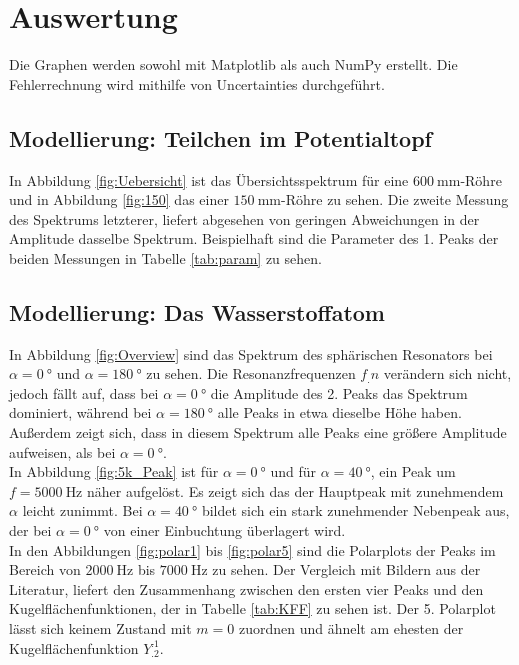 \section{Auswertung}
\label{sec:Auswertung}

Die Graphen werden sowohl mit Matplotlib \cite{matplotlib} als auch NumPy \cite{numpy} erstellt. Die Fehlerrechnung wird mithilfe von Uncertainties \cite{uncertainties} durchgeführt.

\subsection{Modellierung: Teilchen im Potentialtopf}

In Abbildung \ref{fig:Uebersicht} ist das Übersichtsspektrum für eine $\SI{600}{\milli\meter}$-Röhre und in Abbildung \ref{fig:150} das einer $\SI{150}{\milli\meter}$-Röhre zu sehen.
Die zweite Messung des Spektrums letzterer, liefert abgesehen von geringen Abweichungen in der Amplitude dasselbe Spektrum.
Beispielhaft sind die Parameter des 1. Peaks der beiden Messungen in Tabelle \ref{tab:param} zu sehen.

\subsection{Modellierung: Das Wasserstoffatom}

In Abbildung \ref{fig:Overview} sind das Spektrum des sphärischen Resonators bei $\alpha=\SI{0}{\degree}$ und $\alpha=\SI{180}{\degree}$
zu sehen.
Die Resonanzfrequenzen $f_.n$ verändern sich nicht, jedoch fällt auf, dass bei $\alpha=\SI{0}{\degree}$ die Amplitude des 2. Peaks das Spektrum dominiert, während bei $\alpha=\SI{180}{\degree}$ alle Peaks in etwa dieselbe Höhe haben. Außerdem zeigt sich, dass in diesem Spektrum alle Peaks eine größere Amplitude aufweisen, als bei $\alpha=\SI{0}{\degree}$.\\
In Abbildung \ref{fig:5k_Peak} ist für $\alpha=\SI{0}{\degree}$ und für $\alpha=\SI{40}{\degree}$, ein Peak um $f=\SI{5000}{\hertz}$
näher aufgelöst.
Es zeigt sich das der Hauptpeak mit zunehmendem $\alpha$ leicht zunimmt. Bei $\alpha=\SI{40}{\degree}$ bildet sich ein stark zunehmender Nebenpeak aus, der bei $\alpha=\SI{0}{\degree}$ von einer Einbuchtung überlagert wird.\\
In den Abbildungen \ref{fig:polar1} bis \ref{fig:polar5} sind die Polarplots der Peaks im Bereich von $\SI{2000}{\hertz}$ bis $\SI{7000}{\hertz}$ zu sehen.
Der Vergleich mit Bildern aus der Literatur\cite{V23}, liefert den Zusammenhang zwischen den ersten vier Peaks und den Kugelflächenfunktionen, der in Tabelle \ref{tab:KFF} zu sehen ist.
Der 5. Polarplot lässt sich keinem Zustand mit $m=0$ zuordnen und ähnelt am ehesten der Kugelflächenfunktion $Y^.1_.2$.

